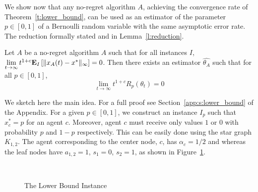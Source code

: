We show now that any no-regret algorithm $A$, achieving the
convergence rate of Theorem~\ref{t:lower_bound}, can be used as an
estimator of the parameter $p \in [0,1]$ of a Bernoulli random variable with
the same asymptotic error rate.
The reduction formally stated and in Lemma~\ref{l:reduction}.
\begin{lemma}\label{l:reduction}
  Let $A$ be a no-regret algorithm $A$ such that for all instances $I$,
  $\lim \limits_{t \rightarrow \infty} t^{1+c}
  \bm{\mathrm{E}}_{I} \left[ \| x_A(t)-x^* \|_{\infty} \right]=0$.
  Then there exists an estimator $\hat{\theta_A}$ such that for all
  $p \in [0,1]$,
  \[\lim_{t \rightarrow \infty}t^{1+c}R_p(\theta_t)=0\]
\end{lemma}

We sketch here the main idea. For a full proof see Section~\ref{app:s:lower_bound}
of the Appendix.  For a given $p \in [0,1]$, we construct an instance $I_p$ such that
$x_c^*=p$ for an agent $c$. Moreover, agent $c$ must
receive only values $1$ or $0$ with probability $p$ and $1-p$ respectively.
This can be easily done using the star graph $K_{1,2}$.
The agent corresponding to the center node, $c$, has $\alpha_c = 1/2$ and
whereas the leaf nodes have $a_{1,2} = 1$, $s_1 = 0$, $s_2 = 1$,
as shown in Figure~\ref{fig:lb_instance}.
%
\begin{figure}\
  \centering

  \caption{The Lower Bound Instance} \label{fig:lb_instance}
\end{figure}
